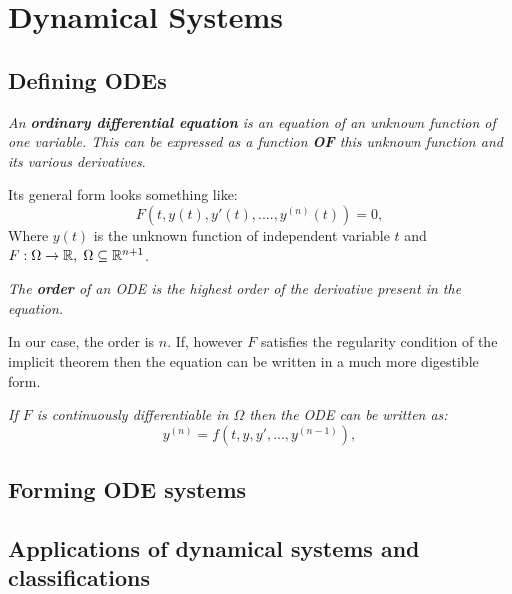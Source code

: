 \chapter{Dynamical Systems}
\label{chap:ch3}


\section{Defining ODEs}
\begin{definition}
    \textit{An \textbf{ordinary differential equation} is an equation of an unknown function of one variable. This can be expressed as a function \textbf{OF} this unknown function and its various derivatives}.
\end{definition}
Its general form looks something like:
\begin{equation}\label{eq:3.1.1}
    F(t,y(t),y'(t),....,y^{(n)}(t))=0,
\end{equation}
Where $y(t)$ is the unknown function of independent variable $t$ and $F : \Omega \rightarrow \mathbb{R},\hspace{0.1cm}\Omega \subseteq \mathbb{R}^{n+1}$.

\begin{definition}
    \textit{The \textbf{order} of an ODE is the highest order of the derivative present in the equation.}
\end{definition}

In our case, the order is $n$.
If, however $F$ satisfies the regularity condition of the implicit theorem then the equation can be written in a much more digestible form.

\begin{theorem}
    \textit{If $F$ is continuously differentiable in $\Omega$ then the ODE can be written as:}
    \begin{equation}\label{eq:3.1.2}
        y^{(n)}=f(t,y,y',...,y^{(n-1)}),
    \end{equation}
\end{theorem}


\section{Forming ODE systems}


\section{Applications of dynamical systems and classifications}
